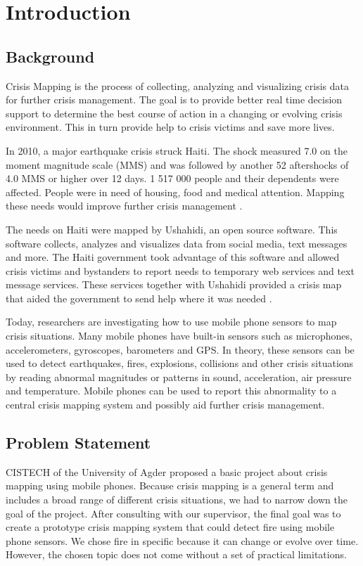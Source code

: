 \chapter{Introduction}

\section{Background}

Crisis Mapping is the process of collecting, analyzing and visualizing crisis data for further crisis management. The goal is to provide better real time decision support to determine the best course of action in a changing or evolving crisis environment. This in turn provide help to crisis victims and save more lives.

In 2010, a major earthquake crisis struck Haiti. The shock measured 7.0 on the moment magnitude scale (MMS) and was followed by another 52 aftershocks of 4.0 MMS or higher over 12 days. 1 517 000 people and their dependents were affected. People were in need of housing, food and medical attention. Mapping these needs would improve further crisis management \cite{}.

The needs on Haiti were mapped by Ushahidi, an open source software. This software collects, analyzes and visualizes data from social media, text messages and more. The Haiti government took advantage of this software and allowed crisis victims and bystanders to report needs to temporary web services and text message services. These services together with Ushahidi provided a crisis map that aided the government to send help where it was needed \cite{}.

Today, researchers are investigating how to use mobile phone sensors to map crisis situations. Many mobile phones have built-in sensors such as microphones, accelerometers, gyroscopes, barometers and GPS. In theory, these sensors can be used to detect earthquakes, fires, explosions, collisions and other crisis situations by reading abnormal magnitudes or patterns in sound, acceleration, air pressure and temperature. Mobile phones can be used to report this abnormality to a central crisis mapping system and possibly aid further crisis management.

\section{Problem Statement}

CISTECH of the University of Agder proposed a basic project about crisis mapping using mobile phones. Because crisis mapping is a general term and includes a broad range of different crisis situations, we had to narrow down the goal of the project. After consulting with our supervisor, the final goal was to create a prototype crisis mapping system that could detect fire using mobile phone sensors. We chose fire in specific because it can change or evolve over time. However, the chosen topic does not come without a set of practical limitations.


